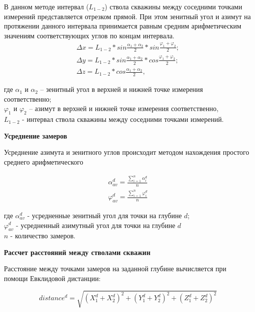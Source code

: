 В данном методе интервал ($ L_{1-2} $) ствола скважины между соседними точками измерений представляется отрезком прямой. При этом зенитный угол
и азимут на протяжении данного интервала принимается равным средним арифметическим значениям соответствующих углов по концам интервала.
\begin{equation}
  \begin{split}
    \Delta x = L_{1-2} * sin \frac{\alpha_1 + \alpha_2}{2} * sin \frac{\varphi_1 + \varphi_2}{2};\\
    \Delta y = L_{1-2} * sin \frac{\alpha_1 + \alpha_2}{2} * cos \frac{\varphi_1 + \varphi_2}{2};\\
    \Delta z = L_{1-2} * cos \frac{\alpha_1 + \alpha_2}{2},
  \end{split}
\end{equation}

где $ \alpha_1 $ и $ \alpha_2 $ – зенитный угол в верхней и нижней точке измерения соответственно;\\
$ \varphi_1 $ и $ \varphi_2 $ – азимут в верхней и нижней точке измерения соответственно,\\
$ L_{1-2} $ - интервал ствола скважины между соседними точками измерений.

\textbf{Усреднение замеров}

Усреднение азимута и зенитного углов происходит методом нахождения простого среднего арифметического

\begin{equation}
  \begin{split}
    \alpha_{av}^d = \frac{\sum\limits_{i=1}^{n} \alpha_i^d}{n}\\
    \varphi_{av}^d = \frac{\sum\limits_{i=1}^{n} \varphi_i^d}{n}
  \end{split}
\end{equation}

где $ \alpha_{av}^d $ - усредненные зенитный угол для точки на глубине $d$;\\
$ \varphi_{av}^d $ - усредненный азимутный угол для точки на глубине $d$\\
$ n $ - количество замеров.

\textbf{Рассчет расстояний между стволами скважин}

Расстояние между точками замеров на заданной глубине вычисляется при помощи Евклидовой дистанции:

\begin{equation}
  distance^d = \sqrt{(X_1^d + X_2^d)^2 + (Y_1^d + Y_2^d)^2 + (Z_1^d + Z_2^d)^2 }
\end{equation}

